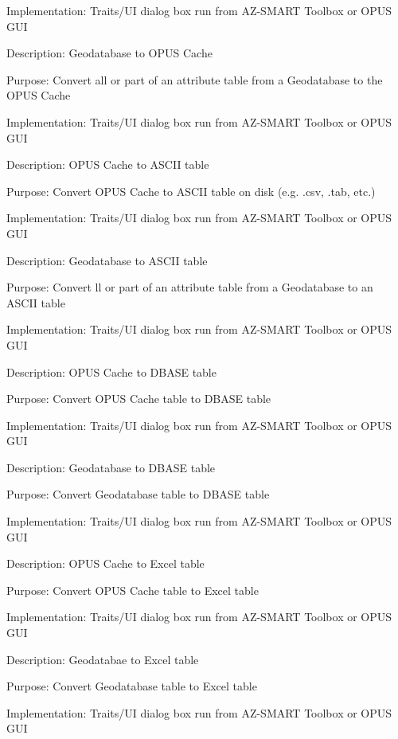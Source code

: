 Implementation: Traits/UI dialog box run from AZ-SMART Toolbox or OPUS GUI

\bigskip

Description: Geodatabase to OPUS Cache

Purpose: Convert all or part of an attribute table from a Geodatabase to the OPUS Cache

Implementation: Traits/UI dialog box run from AZ-SMART Toolbox or OPUS GUI

\bigskip

Description: OPUS Cache to ASCII table

Purpose: Convert OPUS Cache to ASCII table on disk (e.g. .csv, .tab, etc.)

Implementation: Traits/UI dialog box run from AZ-SMART Toolbox or OPUS GUI

\bigskip

Description: Geodatabase to ASCII table

Purpose: Convert ll or part of an attribute table from a Geodatabase to an ASCII table

Implementation: Traits/UI dialog box run from AZ-SMART Toolbox or OPUS GUI

\bigskip

Description: OPUS Cache to DBASE table

Purpose: Convert OPUS Cache table to DBASE table

Implementation: Traits/UI dialog box run from AZ-SMART Toolbox or OPUS GUI

\bigskip

Description: Geodatabase to DBASE table

Purpose: Convert Geodatabase table to DBASE table

Implementation: Traits/UI dialog box run from AZ-SMART Toolbox or OPUS GUI

\bigskip

Description: OPUS Cache to Excel table

Purpose: Convert OPUS Cache table to Excel table

Implementation: Traits/UI dialog box run from AZ-SMART Toolbox or OPUS GUI

\bigskip

Description: Geodatabae to Excel table

Purpose: Convert Geodatabase table to Excel table

Implementation: Traits/UI dialog box run from AZ-SMART Toolbox or OPUS GUI

\bigskip

